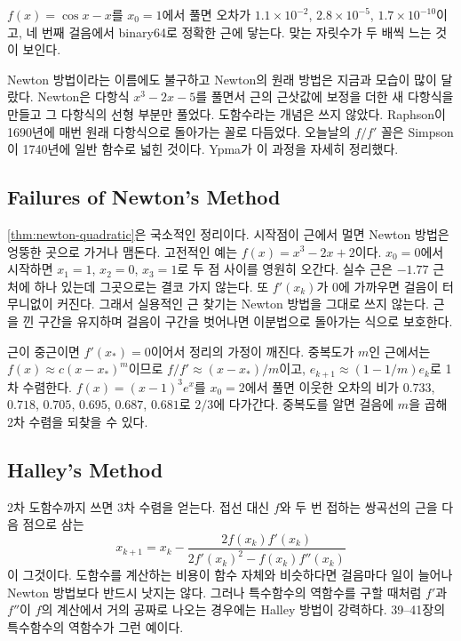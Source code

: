 $f(x)=\cos x-x$를 $x_0=1$에서 풀면 오차가 $1.1\times10^{-2}$, $2.8\times10^{-5}$, $1.7\times10^{-10}$이고, 네 번째 걸음에서 binary64로 정확한 근에 닿는다. 맞는 자릿수가 두 배씩 느는 것이 보인다.

\begin{aside}
Newton 방법이라는 이름에도 불구하고 Newton의 원래 방법은 지금과 모습이 많이 달랐다. Newton은 다항식 $x^3-2x-5$를 풀면서 근의 근삿값에 보정을 더한 새 다항식을 만들고 그 다항식의 선형 부분만 풀었다. 도함수라는 개념은 쓰지 않았다. Raphson이 1690년에 매번 원래 다항식으로 돌아가는 꼴로 다듬었다. 오늘날의 $f/f'$ 꼴은 Simpson이 1740년에 일반 함수로 넓힌 것이다. Ypma가 이 과정을 자세히 정리했다\cite{ypma1995}.
\end{aside}

\subsection{Failures of Newton's Method}

\cref{thm:newton-quadratic}은 국소적인 정리이다. 시작점이 근에서 멀면 Newton 방법은 엉뚱한 곳으로 가거나 맴돈다. 고전적인 예는 $f(x)=x^3-2x+2$이다. $x_0=0$에서 시작하면 $x_1=1$, $x_2=0$, $x_3=1$로 두 점 사이를 영원히 오간다. 실수 근은 $-1.77$ 근처에 하나 있는데 그곳으로는 결코 가지 않는다. 또 $f'(x_k)$가 $0$에 가까우면 걸음이 터무니없이 커진다. 그래서 실용적인 근 찾기는 Newton 방법을 그대로 쓰지 않는다. 근을 낀 구간을 유지하며 걸음이 구간을 벗어나면 이분법으로 돌아가는 식으로 보호한다.

근이 중근이면 $f'(x_\ast)=0$이어서 정리의 가정이 깨진다. 중복도가 $m$인 근에서는 $f(x)\approx c(x-x_\ast)^m$이므로 $f/f'\approx(x-x_\ast)/m$이고, $e_{k+1}\approx(1-1/m)e_k$로 1차 수렴한다. $f(x)=(x-1)^3e^x$를 $x_0=2$에서 풀면 이웃한 오차의 비가 $0.733$, $0.718$, $0.705$, $0.695$, $0.687$, $0.681$로 $2/3$에 다가간다. 중복도를 알면 걸음에 $m$을 곱해 2차 수렴을 되찾을 수 있다.

\subsection{Halley's Method}

2차 도함수까지 쓰면 3차 수렴을 얻는다. 접선 대신 $f$와 두 번 접하는 쌍곡선의 근을 다음 점으로 삼는 
\[
x_{k+1}=x_k-\frac{2f(x_k)f'(x_k)}{2f'(x_k)^2-f(x_k)f''(x_k)}
\]
이 그것이다\cite{scavo1995halley}. 도함수를 계산하는 비용이 함수 자체와 비슷하다면 걸음마다 일이 늘어나 Newton 방법보다 반드시 낫지는 않다. 그러나 특수함수의 역함수를 구할 때처럼 $f'$과 $f''$이 $f$의 계산에서 거의 공짜로 나오는 경우에는 Halley 방법이 강력하다. 39--41장의 특수함수의 역함수가 그런 예이다.

